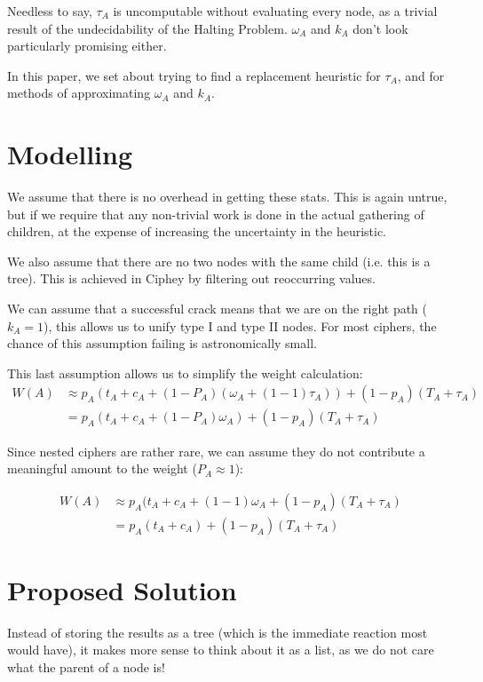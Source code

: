\documentclass{article}
\theoremstyle{definition}
\begin{document}
Needless to say, $\tau_A$ is uncomputable without evaluating every node, as a
trivial result of the undecidability of the Halting Problem. $\omega_A$ and $k_A$
don't look particularly promising either.

In this paper, we set about trying to find a replacement heuristic for $\tau_A$, and for
methods of approximating $\omega_A$ and $k_A$.

\section{Modelling}
We assume that there is no overhead in getting these stats. This is again untrue,
but if we require that any non-trivial work is done in the actual gathering of 
children, at the expense of increasing the uncertainty in the heuristic.

We also assume that there are no two nodes with the same child (i.e. this is a tree). This is achieved in Ciphey by filtering out reoccurring values.

We can assume that a successful crack means that we are on the right path ($k_A = 1$),
this allows us to unify type I and type II nodes. For most ciphers, the chance of this
assumption failing is astronomically small.

This last assumption allows us to simplify the weight calculation:
\begin{align*}
W(A) &\approx p_A (t_A + c_A + (1-P_A) (\omega_A + (1-1) \tau_A)) + (1 - p_A) (T_A + \tau_A) \\
     &= p_A (t_A + c_A + (1-P_A) \omega_A) + (1 - p_A) (T_A + \tau_A)
\end{align*}

Since nested ciphers are rather rare, we can assume they do not contribute a meaningful
amount to the weight ($P_A \approx 1$):

\begin{align*}
W(A) &\approx p_A (t_A + c_A + (1-1) \omega_A + (1 - p_A) (T_A + \tau_A) \\
     &= p_A (t_A + c_A) + (1 - p_A) (T_A + \tau_A)
\end{align*}
\section{Proposed Solution}
Instead of storing the results as a tree (which is the immediate reaction most would 
have), it makes more sense to think about it as a list, as we do not care what the
parent of a node is!
\end{document}
